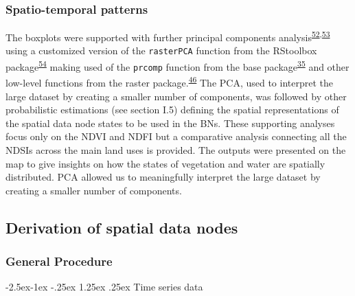\documentclass[12pt,oneside]{article}
\makeatletter
\renewcommand\paragraph{\@startsection{paragraph}{4}{\z@}%
            {-2.5ex\@plus -1ex \@minus -.25ex}%
            {1.25ex \@plus .25ex}%
            {\normalfont\normalsize\bfseries}}
\makeatother
\begin{document}
\hypertarget{I.4.2}{%
\subsubsection{Spatio-temporal patterns}\label{I.4.2}}

The boxplots were supported with further principal components
analysis\textsuperscript{\protect\hyperlink{ref-Mardia_et_al_1979}{52},\protect\hyperlink{ref-Pearson_1901}{53}}
using a customized version of the \texttt{rasterPCA} function from the
RStoolbox
package\textsuperscript{\protect\hyperlink{ref-Leutner_et_al_2019}{54}}
making used of the \texttt{prcomp} function from the base
package\textsuperscript{\protect\hyperlink{ref-RCoreTeam_2018}{35}} and
other low-level functions from the raster
package.\textsuperscript{\protect\hyperlink{ref-Hijmans_2019}{46}} The
PCA, used to interpret the large dataset by creating a smaller number of
components, was followed by other probabilistic estimations (see section
I.5) defining the spatial representations of the spatial data node
states to be used in the BNs. These supporting analyses focus only on
the NDVI and NDFI but a comparative analysis connecting all the NDSIs
across the main land uses is provided. The outputs were presented on the
map to give insights on how the states of vegetation and water are
spatially distributed. PCA allowed us to meaningfully interpret the
large dataset by creating a smaller number of components.

\hypertarget{I.5}{%
\subsection{Derivation of spatial data nodes}\label{I.5}}

\hypertarget{I.5.1}{%
\subsubsection{General Procedure}\label{I.5.1}}

\hypertarget{I.5.1.1}{%
\paragraph{Time series data}\label{I.5.1.1}}
\end{document}
